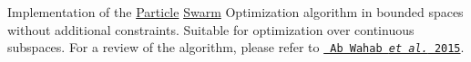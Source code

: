 Implementation of the \mbox{\hyperlink{class_particle}{Particle}} \mbox{\hyperlink{class_swarm}{Swarm}} Optimization algorithm in bounded spaces without additional constraints. Suitable for optimization over continuous subspaces. For a review of the algorithm, please refer to \href{https://journals.plos.org/plosone/article?id=10.1371/journal.pone.0122827}{\texttt{ Ab Wahab {\itshape et al.} 2015}}. 